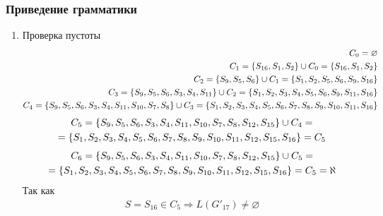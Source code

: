 \subsubsection{Приведение грамматики}
\begin{enumerate}
	\item Проверка пустоты
	      \begin{align*}
		      C_0 = \varnothing                                                                                                                                  \\
		      C_1 = \left\{S_{16}, S_1, S_2\right\} \cup C_0 = \left\{S_{16}, S_1, S_2\right\}                                                                                     \\
		      C_2 = \left\{S_9, S_5, S_6\right\} \cup C_1 = \left\{S_1, S_2, S_5, S_6, S_9, S_{16}\right\}                                                                         \\
		      C_3 = \left\{S_9, S_5, S_6, S_3, S_4, S_{11}\right\} \cup C_2 = \left\{S_1, S_2, S_3, S_4, S_5, S_6, S_9, S_{11}, S_{16}\right\}                                     \\
		      C_4 = \left\{S_9, S_5, S_6, S_3, S_4, S_{11}, S_{10}, S_7, S_8\right\} \cup C_3 = \left\{S_1, S_2, S_3, S_4, S_5, S_6, S_7, S_8, S_9, S_{10}, S_{11}, S_{16}\right\} \\
	      \end{align*}
	      \begin{multline*}
		      C_5 = \left\{S_9, S_5, S_6, S_3, S_4, S_{11}, S_{10}, S_7, S_8, S_{12}, S_{15}\right\} \cup C_4 =                                                           \\
		      = \left\{S_1, S_2, S_3, S_4, S_5, S_6, S_7, S_8, S_9, S_{10}, S_{11}, S_{12}, S_{15}, S_{16}\right\} = C_5
	      \end{multline*}
	      \begin{multline*}
		      C_6 = \left\{S_9, S_5, S_6, S_3, S_4, S_{11}, S_{10}, S_7, S_8, S_{12}, S_{15}\right\} \cup C_5 =                                                           \\
		      = \left\{S_1, S_2, S_3, S_4, S_5, S_6, S_7, S_8, S_9, S_{10}, S_{11}, S_{12}, S_{15}, S_{16}\right\} = C_5                                                  = \aleph
	      \end{multline*}
	      Так как
	      \begin{align}
		      S = S_{16} \in C_5 \Longrightarrow L(G'_{17}) \not= \varnothing
	      \end{align}
\end{enumerate}
